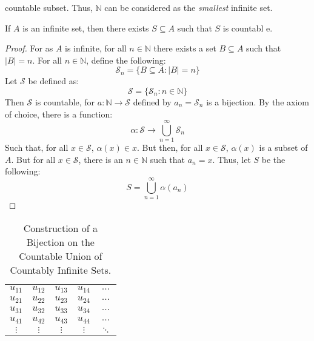             countable subset. Thus, $\mathbb{N}$ can be
            considered as the \textit{smallest} infinite set.
            \begin{theorem}
                If $A$ is an infinite set, then there exists
                $S\subseteq{A}$ such that $S$ is countabl e.
            \end{theorem}
            \begin{proof}
                For as $A$ is infinite, for all $n\in\mathbb{N}$
                there exists a set $B\subseteq{A}$ such that
                $|B|=n$. For all $n\in\mathbb{N}$,
                define the following:
                \begin{equation}
                    \mathcal{S}_{n}=\{B\subseteq{A}:|B|=n\}
                \end{equation}
                Let $\mathcal{S}$ be defined as:
                \begin{equation}
                    \mathcal{S}=\{\mathcal{S}_{n}:n\in\mathbb{N}\}
                \end{equation}
                Then $\mathcal{S}$ is countable, for
                $a:\mathbb{N}\rightarrow\mathcal{S}$ defined
                by $a_{n}=\mathcal{S}_{n}$ is a bijection.
                By the axiom of choice, there is a function:
                \begin{equation}
                    \alpha:\mathcal{S}\rightarrow
                    \bigcup_{n=1}^{\infty}\mathcal{S}_{n}
                \end{equation}
                Such that, for all $x\in\mathcal{S}$,
                $\alpha(x)\in{x}$. But then, for all
                $x\in\mathcal{S}$, $\alpha(x)$ is a subset
                of $A$. But for all $x\in\mathcal{S}$, there
                is an $n\in\mathbb{N}$ such that
                $a_{n}=x$. Thus, let $S$ be the following:
                \begin{equation}
                    S=\bigcup_{n=1}^{\infty}\alpha(a_{n})
                \end{equation}
            \end{proof}
            \begin{table}[H]
                \captionsetup{type=table}
                \centering
                \begin{tabular}{ccccc}
                    $u_{11}$&$u_{12}$&$u_{13}$
                    &$u_{14}$&$\hdots$\\
                    $u_{21}$&$u_{22}$&$u_{23}$
                    &$u_{24}$&$\hdots$\\
                    $u_{31}$&$u_{32}$&$u_{33}$
                    &$u_{34}$&$\hdots$\\
                    $u_{41}$&$u_{42}$&$u_{43}$
                    &$u_{44}$&$\hdots$\\
                    $\vdots$&$\vdots$&$\vdots$
                    &$\vdots$&$\ddots$
                \end{tabular}
                \caption{Construction of a Bijection on the
                         Countable Union of Countably Infinite
                         Sets.}
                \label{table:Countable_Union_of_Countable}
            \end{table}
